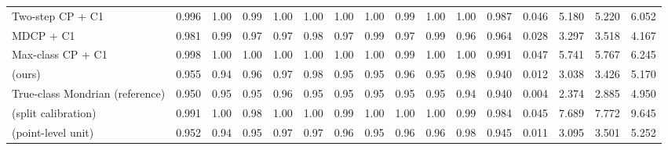 \begin{table}[!htbp]
{\begin{tabular}{lccccccccccccccc}
Two-step CP + C1 & 0.996 & 1.00 & 0.99 & 1.00 & 1.00 & 1.00 & 1.00 & 0.99 & 1.00 & 1.00 & 0.987 & 0.046 & 5.180 & 5.220 & 6.052 \\
MDCP + C1 & 0.981 & 0.99 & 0.97 & 0.97 & 0.98 & 0.97 & 0.99 & 0.97 & 0.99 & 0.96 & 0.964 & 0.028 & 3.297 & 3.518 & 4.167 \\
Max-class CP + C1 & 0.998 & 1.00 & 1.00 & 1.00 & 1.00 & 1.00 & 1.00 & 0.99 & 1.00 & 1.00 & 0.991 & 0.047 & 5.741 & 5.767 & 6.245 \\
\gamut{} (ours) & 0.955 & 0.94 & 0.96 & 0.97 & 0.98 & 0.95 & 0.95 & 0.96 & 0.95 & 0.98 & 0.940 & 0.012 & 3.038 & 3.426 & 5.170 \\
True-class Mondrian (reference) & 0.950 & 0.95 & 0.95 & 0.96 & 0.95 & 0.95 & 0.95 & 0.95 & 0.95 & 0.94 & 0.940 & 0.004 & 2.374 & 2.885 & 4.950 \\
\gamut{} (split calibration) & 0.991 & 1.00 & 0.98 & 1.00 & 1.00 & 0.99 & 1.00 & 1.00 & 1.00 & 0.99 & 0.984 & 0.045 & 7.689 & 7.772 & 9.645 \\
\gamut{} (point-level unit) & 0.952 & 0.94 & 0.95 & 0.97 & 0.97 & 0.96 & 0.95 & 0.96 & 0.96 & 0.98 & 0.945 & 0.011 & 3.095 & 3.501 & 5.252 \\
\bottomrule
\end{tabular}}
\end{table}


